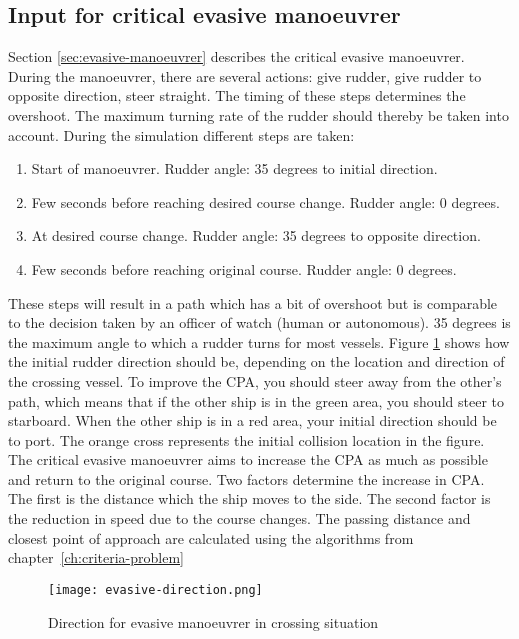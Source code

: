 \subsection{Input for critical evasive manoeuvrer}
Section \ref{sec:evasive-manoeuvrer} describes the critical evasive manoeuvrer. During the manoeuvrer, there are several actions: give rudder, give rudder to opposite direction, steer straight. The timing of these steps determines the overshoot. The maximum turning rate of the rudder should thereby be taken into account.
During the simulation different steps are taken:
\begin{enumerate}
	\item Start of manoeuvrer. Rudder angle: 35 degrees to initial direction.
	\item Few seconds before reaching desired course change. Rudder angle: 0 degrees.
	\item At desired course change. Rudder angle: 35 degrees to opposite direction.
	\item Few seconds before reaching original course. Rudder angle: 0 degrees.
\end{enumerate}
These steps will result in a path which has a bit of overshoot but is comparable to the decision taken by an officer of watch (human or autonomous). 35 degrees is the maximum angle to which a rudder turns for most vessels. Figure \ref{fig:evasive-direction} shows how the initial rudder direction should be, depending on the location and direction of the crossing vessel. To improve the CPA, you should steer away from the other's path, which means that if the other ship is in the green area, you should steer to starboard. When the other ship is in a red area, your initial direction should be to port. The orange cross represents the initial collision location in the figure.
The critical evasive manoeuvrer aims to increase the \ac{CPA} as much as possible and return to the original course. Two factors determine the increase in \ac{CPA}. 
The first is the distance which the ship moves to the side. The second factor is the reduction in speed due to the course changes. The passing distance and closest point of approach are calculated using the algorithms from chapter~\ref{ch:criteria-problem}

\begin{figure}[p]
	\centering
	\texttt{[image: evasive-direction.png]}
	\caption{Direction for evasive manoeuvrer in crossing situation}
	\label{fig:evasive-direction} 
\end{figure}
